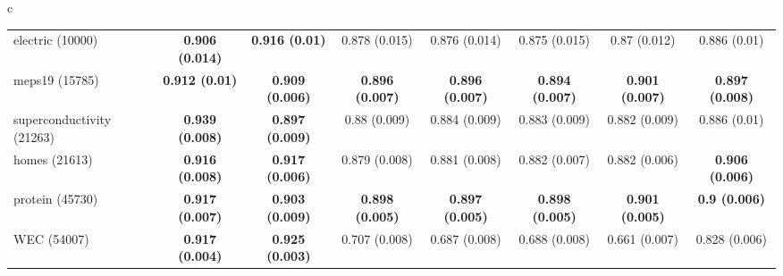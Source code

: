 \documentclass[border=6pt]{standalone}
\begin{document}
\begin{adjustbox}{max width=\linewidth}
\begin{tabular}{c}
\begin{tabular}{lccccccc}
electric (10000) & \textbf{0.906 (0.014)} & \textbf{0.916 (0.01)} & 0.878 (0.015) & 0.876 (0.014) & 0.875 (0.015) & 0.87 (0.012) & 0.886 (0.01)\\
meps19 (15785) & \textbf{0.912 (0.01)} & \textbf{0.909 (0.006)} & \textbf{0.896 (0.007)} & \textbf{0.896 (0.007)} & \textbf{0.894 (0.007)} & \textbf{0.901 (0.007)} & \textbf{0.897 (0.008)}\\
superconductivity (21263) & \textbf{0.939 (0.008)} & \textbf{0.897 (0.009)} & 0.88 (0.009) & 0.884 (0.009) & 0.883 (0.009) & 0.882 (0.009) & 0.886 (0.01)\\
homes (21613) & \textbf{0.916 (0.008)} & \textbf{0.917 (0.006)} & 0.879 (0.008) & 0.881 (0.008) & 0.882 (0.007) & 0.882 (0.006) & \textbf{0.906 (0.006)}\\
protein (45730) & \textbf{0.917 (0.007)} & \textbf{0.903 (0.009)} & \textbf{0.898 (0.005)} & \textbf{0.897 (0.005)} & \textbf{0.898 (0.005)} & \textbf{0.901 (0.005)} & \textbf{0.9 (0.006)}\\
WEC (54007) & \textbf{0.917 (0.004)} & \textbf{0.925 (0.003)} & 0.707 (0.008) & 0.687 (0.008) & 0.688 (0.008) & 0.661 (0.007) & 0.828 (0.006)\\
\hline
\end{tabular}
\end{tabular}
\end{adjustbox}
\end{document}
